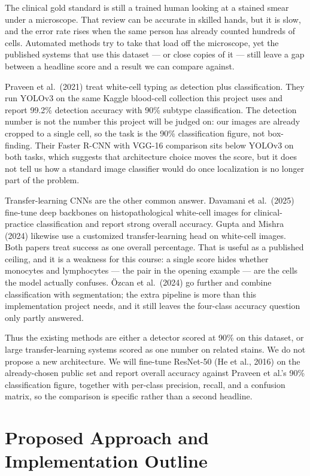 \documentclass[11pt]{article}
\begin{document}
The clinical gold standard is still a trained human looking at a stained smear under a microscope. That review can be accurate in skilled hands, but it is slow, and the error rate rises when the same person has already counted hundreds of cells. Automated methods try to take that load off the microscope, yet the published systems that use this dataset --- or close copies of it --- still leave a gap between a headline score and a result we can compare against.

Praveen et al.\ (2021) treat white-cell typing as detection plus classification. They run YOLOv3 on the same Kaggle blood-cell collection this project uses and report 99.2\% detection accuracy with 90\% subtype classification. The detection number is not the number this project will be judged on: our images are already cropped to a single cell, so the task is the 90\% classification figure, not box-finding. Their Faster R-CNN with VGG-16 comparison sits below YOLOv3 on both tasks, which suggests that architecture choice moves the score, but it does not tell us how a standard image classifier would do once localization is no longer part of the problem.

Transfer-learning CNNs are the other common answer. Davamani et al.\ (2025) fine-tune deep backbones on histopathological white-cell images for clinical-practice classification and report strong overall accuracy. Gupta and Mishra (2024) likewise use a customized transfer-learning head on white-cell images. Both papers treat success as one overall percentage. That is useful as a published ceiling, and it is a weakness for this course: a single score hides whether monocytes and lymphocytes --- the pair in the opening example --- are the cells the model actually confuses. \"{O}zcan et al.\ (2024) go further and combine classification with segmentation; the extra pipeline is more than this implementation project needs, and it still leaves the four-class accuracy question only partly answered.

Thus the existing methods are either a detector scored at 90\% on this dataset, or large transfer-learning systems scored as one number on related stains. We do not propose a new architecture. We will fine-tune ResNet-50 (He et al., 2016) on the already-chosen public set and report overall accuracy against Praveen et al.'s 90\% classification figure, together with per-class precision, recall, and a confusion matrix, so the comparison is specific rather than a second headline.

\section{Proposed Approach and Implementation Outline}
\end{document}
